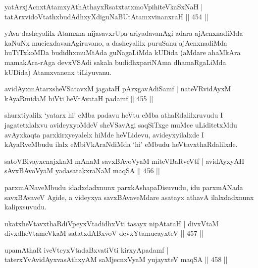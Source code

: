 \begin{shl}
yatArxjAcnxtAtamxyAthAthayxRsatxtatxmoVpihiteVkaSxNaH |
tatArxvidoVtathxbudAdhxyXdiguNaBUtAtamxvinanxraH \hfill  || 454 ||
\end{shl}

\begin{artha}
yAva dasheyalilx Atamxna nijasavxrUpa ariyadavanAgi adara ajAcnxnadiMda kaNuNx mucicxdavanAgiruvano, a dasheyalilx puruSanu ajAcnxnadiMda huTiTxkoMDa budidhxmuMtAda guNagaLiMda kUDida (aMdare ahaMkAra mamakAra-rAga devxVSAdi sakala budidhxpariNAma dhamaRgaLiMda kUDida) Atamxvanenx tiLiyuvanu.
\end{artha}


\begin{shl}
avidAyxmAtarxsheVSatavxM jagataH pArxgavAdiSamf |
nateVR\s vidAyxM kAyaRmidaM hiVti heVtAvataH padamf \hfill  || 455 ||
\end{shl}

\begin{artha}
shurxtiyalilx `yatarx hi' eMba padavu heVtu eMba athaRdalilxruvudu I jagatetxlalxvu avideyxyoMdeV sheVSavAgi saqSiTxge muMce uLiditetxMdu avAyxkaqta parxkirxyeyalelx hiMde heVLidevu, avideyxyilalxde I kAyaRveMbudu ilalx eMbiVkAraNdiMda `hi' eMbudu heVtavxthaRdalilxde.
\end{artha}

\begin{shl}
satoV\s BivayxcnajxkaM mAnaM savxBAvoV\s yaM miteVBaRveVtf |
avidAyxyAH sAvxBAvoV\s yaM yadasatakxraNaM maqSA \hfill  || 456 ||
\end{shl}

\begin{artha}
parxmANaveMbudu idadxdadxnunx parxkAshapaDisuvudu,  idu parxmANada savxBAvaveV Agide, a videyxya savxBAvaveMdare asatayx athavA ilalxdadxnunx kalipxsuvudu.
\end{artha}

\begin{shl}
ukatxheVtavxthaRdiVpeyxVtadidhxVti tasayx nipAtataH |
divxVtaM divxdheVtameVkaM satatxdABxvoV devxYtamucayxteV \hfill  || 457 ||
\end{shl}
\begin{shl}
upamAthaR iveVteyxVtadaBxvatiVti kirxyApadamf |
taterxYvAvidAyxvasAthxyAM saMjecnxVyaM yujayxteV maqSA \hfill  || 458 ||
\end{shl}

